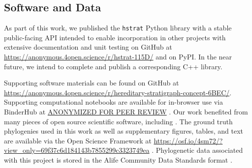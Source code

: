 \subsection{Software and Data}


As part of this work, we published the \texttt{hstrat} Python library with a stable public-facing API intended to enable incorporation in other projects with extensive documentation and unit testing on GitHub at \url{https://anonymous.4open.science/r/hstrat-115D/} and on PyPI.%
In the near future, we intend to complete and publish a corresponding C++ library.

Supporting software materials can be found on GitHub at \url{https://anonymous.4open.science/r/hereditary-stratigraph-concept-6BEC/}.%
Supporting computational notebooks are available for in-browser use via BinderHub at \url{ANONYMIZED FOR PEER REVIEW} \citep{ragan2018binder}. %
Our work benefited from many pieces of open source scientific software, including \citep{sukumaran2010dendropy,virtanen2020scipy,hunter2007matplotlib,virtanen2020scipy,waskom2021seaborn,bostock2011d3,meurer2017sympy,smith2020treedistdata,paradis2004ape,ushey2022reticulate,wickham2022dplyr}.
The ground truth phylogenies used in this work as well as supplementary figures, tables, and text are available via the Open Science Framework at
\url{https://osf.io/4sm72/?view_only=69f37c6d184143b7855299c3323749ea} \citep{moreno2022hstratconceptsupplement} \citep{foster2017open}.
Phylogenetic data associated with this project is stored in the Alife Community Data Standards format \citep{lalejini2019data}.
